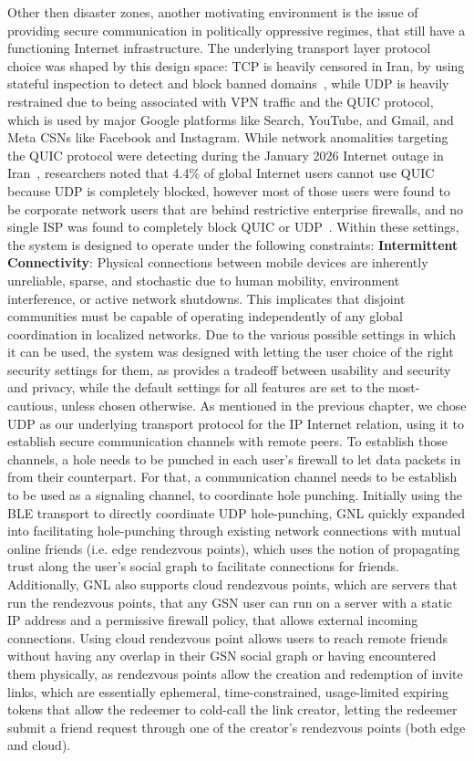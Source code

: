 Other then disaster zones, another motivating environment is the issue of providing secure communication in politically oppressive regimes, that still have a functioning Internet infrastructure. The underlying transport layer protocol choice was shaped by this design space: TCP is heavily censored in Iran, by using stateful inspection to detect and block banned domains~\cite{Aceto2026}, while UDP is heavily restrained due to being associated with VPN traffic and the QUIC protocol, which is used by major Google platforms like Search, YouTube, and Gmail, and Meta CSNs like Facebook and Instagram. While network anomalities targeting the QUIC protocol were detecting during the January 2026 Internet outage in Iran~\cite{Aceto2026}, researchers noted that 4.4\% of global Internet users cannot use QUIC because UDP is completely blocked, however most of those users were found to be corporate network users that are behind restrictive enterprise firewalls, and no single ISP was found to completely block QUIC or UDP~\cite{Langley2017}.
Within these settings, the system is designed to operate under the following constraints:
\textbf{Intermittent Connectivity}: Physical connections between mobile devices are inherently unreliable, sparse, and stochastic due to human mobility, environment interference, or active network shutdowns. This implicates that disjoint communities must be capable of operating independently of any global coordination in localized networks.
Due to the various possible settings in which it can be used, the system was designed with letting the user choice of the right security settings for them, as provides a tradeoff between usability and security and privacy, while the default settings for all features are set to the most-cautious, unless chosen otherwise.
As mentioned in the previous chapter, we chose UDP as our underlying transport protocol for the IP Internet relation, using it to establish secure communication channels with remote peers. To establish those channels, a hole needs to be punched in each user's firewall to let data packets in from their counterpart. For that, a communication channel needs to be establish to be used as a signaling channel, to coordinate hole punching. Initially using the BLE transport to directly coordinate UDP hole-punching, GNL quickly expanded into facilitating hole-punching through existing network connections with mutual online friends (i.e. edge rendezvous points), which uses the notion of propagating trust along the user's social graph to facilitate connections for friends. Additionally, GNL also supports cloud rendezvous points, which are servers that run the rendezvous points, that any GSN user can run on a server with a static IP address and a permissive firewall policy, that allows external incoming connections. Using cloud rendezvous point allows users to reach remote friends without having any overlap in their GSN social graph or having encountered them physically, as rendezvous points allow the creation and redemption of invite links, which are essentially ephemeral, time-constrained, usage-limited expiring tokens that allow the redeemer to cold-call the link creator, letting the redeemer submit a friend request through one of the creator's rendezvous points (both edge and cloud).
